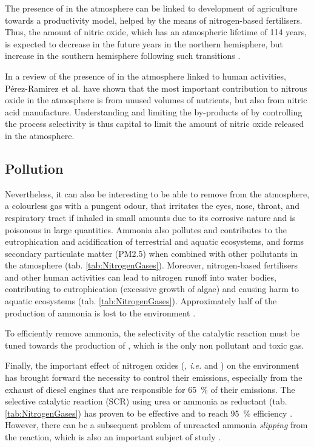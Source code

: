 The presence of  in the atmosphere can be linked to development of agriculture towards a productivity model, helped by the means of nitrogen-based fertilisers.
Thus, the amount of nitric oxide, which has an atmospheric lifetime of 114 years, is expected to decrease in the future years in the northern hemisphere, but increase in the southern hemisphere following such transitions \parencite{Solomon2007, Davidson2009}.

In a review of the presence of  in the atmosphere linked to human activities, Pérez-Ramirez et al. \parencite*{PerezRamirez2003} have shown that the most important contribution to nitrous oxide in the atmosphere is from unused volumes of nutrients, but also from nitric acid manufacture.
Understanding and limiting the by-products of  by controlling the process selectivity is thus capital to limit the amount of nitric oxide released in the atmosphere.

\subsection{Pollution}

Nevertheless, it can also be interesting to be able to remove  from the atmosphere, a colourless gas with a pungent odour, that irritates the eyes, nose, throat, and respiratory tract if inhaled in small amounts due to its corrosive nature and is poisonous in large quantities.
Ammonia also pollutes and contributes to the eutrophication and acidification of terrestrial and aquatic ecosystems, and forms secondary particulate matter (PM2.5) when combined with other pollutants in the atmosphere (tab. \ref{tab:NitrogenGases}).
Moreover, nitrogen-based fertilisers and other human activities can lead to nitrogen runoff into water bodies, contributing to eutrophication (excessive growth of algae) and causing harm to aquatic ecosystems (tab. \ref{tab:NitrogenGases}).
Approximately half of the production of ammonia is lost to the environment \parencite{Erisman2007}.

To efficiently remove ammonia, the selectivity of the catalytic reaction must be tuned towards the production of , which is the only non pollutant and toxic gas.

Finally, the important effect of nitrogen oxides (, \textit{i.e.}  and ) on the environment has brought forward the necessity to control their emissions, especially from the exhaust of diesel engines that are responsible for \qty{65}{\percent} of their emissions.
The selective catalytic reaction (SCR) using urea or ammonia as reductant (tab. \ref{tab:NitrogenGases}) has proven to be effective and to reach \qty{95}{\percent} efficiency \parencite{MitsubishiSCR}.
However, there can be a subsequent problem of unreacted ammonia \textit{slipping} from the reaction, which is also an important subject of study \parencite{Thermofischer}.

